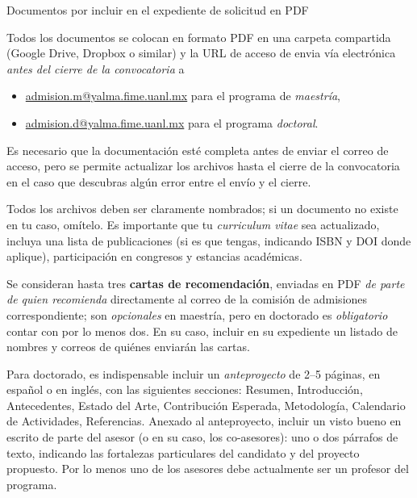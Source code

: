 \documentclass{article}
\begin{document}
\begin{Form}
\newpage

{\sc Documentos por incluir en el expediente de solicitud en PDF}

Todos los documentos se colocan en formato PDF en una carpeta
compartida (Google Drive, Dropbox o similar) y la URL de acceso de
envia vía electrónica {\em antes del cierre de la convocatoria} a
\begin{itemize}
\item \url{admision.m@yalma.fime.uanl.mx} para el programa de {\em maestría},
\item \url{admision.d@yalma.fime.uanl.mx} para el programa {\em doctoral}.
\end{itemize}
Es necesario que la documentación esté completa antes de enviar el
correo de acceso, pero se permite actualizar los archivos hasta el
cierre de la convocatoria en el caso que descubras algún error entre
el envío y el cierre.

Todos los archivos deben ser claramente nombrados; si un documento no
existe en tu caso, omítelo. Es importante que tu {\em curriculum
  vitae} sea actualizado, incluya una lista de publicaciones (si es
que tengas, indicando ISBN y DOI donde aplique), participación en
congresos y estancias académicas.

Se consideran hasta tres {\bf cartas de recomendación}, enviadas en
PDF {\em de parte de quien recomienda} directamente al correo de la
comisión de admisiones correspondiente; son {\em opcionales} en
maestría, pero en doctorado es {\em obligatorio} contar con por lo
menos dos. En su caso, incluir en su expediente un listado de nombres
y correos de quiénes enviarán las cartas.

Para doctorado, es indispensable incluir un {\em anteproyecto} de 2--5
páginas, en español o en inglés, con las siguientes secciones:
Resumen, Introducción, Antecedentes, Estado del Arte, Contribución
Esperada, Metodología, Calendario de Actividades, Referencias. Anexado
al anteproyecto, incluir un visto bueno en escrito de parte del asesor
(o en su caso, los co-asesores): uno o dos párrafos de texto,
indicando las fortalezas particulares del candidato y del proyecto
propuesto. Por lo menos uno de los asesores debe actualmente ser un
profesor del programa.

\begin{flushright}
 \\
 \\
 \\
 \\
 \\
 \\
\end{flushright}


\end{Form}
\end{document}
